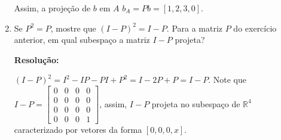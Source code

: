 \documentclass[leqno]{article}
\begin{document}
\begin{enumerate}
    Assim, a projeção de $b$ em $A$ $b_A=Pb=[1,2,3,0]$.
    
    \item Se $P^2=P$, mostre que $(I-P)^2=I-P$. Para a matriz $P$ do exercício anterior, em qual subespaço a matriz $I-P$ projeta?
    
    \textbf{Resolução:}
    
    $(I-P)^2=I^2-IP-PI+P^2=I-2P+P=I-P$. Note que $I-P=\begin{bmatrix}0 & 0 & 0 & 0\\0 & 0 & 0 & 0\\0 & 0 & 0 & 0\\0 & 0 & 0 & 1\end{bmatrix}$, assim, $I-P$ projeta no subespaço de $\mathbb{R}^4$ caracterizado por vetores da forma $[0,0,0,x]$.
    
    
\end{enumerate}

 
\end{document}
